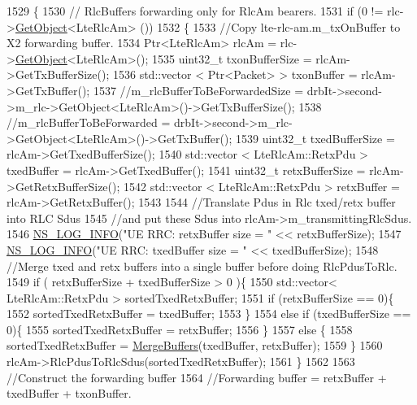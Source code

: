 \begin{DoxyCode}
1529 \{
1530   \textcolor{comment}{// RlcBuffers forwarding only for RlcAm bearers.}
1531   \textcolor{keywordflow}{if} (0 != rlc->\hyperlink{classns3_1_1Object_a13e18c00017096c8381eb651d5bd0783}{GetObject}<LteRlcAm> ())
1532   \{
1533     \textcolor{comment}{//Copy lte-rlc-am.m\_txOnBuffer to X2 forwarding buffer.}
1534     Ptr<LteRlcAm> rlcAm = rlc->\hyperlink{classns3_1_1Object_a13e18c00017096c8381eb651d5bd0783}{GetObject}<LteRlcAm>();
1535     uint32\_t txonBufferSize = rlcAm->GetTxBufferSize();
1536     std::vector < Ptr<Packet> > txonBuffer = rlcAm->GetTxBuffer();
1537     \textcolor{comment}{//m\_rlcBufferToBeForwardedSize =  drbIt->second->m\_rlc->GetObject<LteRlcAm>()->GetTxBufferSize();}
1538     \textcolor{comment}{//m\_rlcBufferToBeForwarded = drbIt->second->m\_rlc->GetObject<LteRlcAm>()->GetTxBuffer();}
1539     uint32\_t txedBufferSize = rlcAm->GetTxedBufferSize();
1540     std::vector < LteRlcAm::RetxPdu > txedBuffer = rlcAm->GetTxedBuffer();
1541     uint32\_t retxBufferSize = rlcAm->GetRetxBufferSize();
1542     std::vector < LteRlcAm::RetxPdu > retxBuffer = rlcAm->GetRetxBuffer();
1543     
1544     \textcolor{comment}{//Translate Pdus in Rlc txed/retx buffer into RLC Sdus}
1545     \textcolor{comment}{//and put these Sdus into rlcAm->m\_transmittingRlcSdus.}
1546     \hyperlink{group__logging_gafbd73ee2cf9f26b319f49086d8e860fb}{NS\_LOG\_INFO}(\textcolor{stringliteral}{"UE RRC: retxBuffer size = "} << retxBufferSize);
1547     \hyperlink{group__logging_gafbd73ee2cf9f26b319f49086d8e860fb}{NS\_LOG\_INFO}(\textcolor{stringliteral}{"UE RRC: txedBuffer size = "} << txedBufferSize);
1548     \textcolor{comment}{//Merge txed and retx buffers into a single buffer before doing RlcPdusToRlc.}
1549     \textcolor{keywordflow}{if} ( retxBufferSize + txedBufferSize > 0 )\{
1550       std::vector< LteRlcAm::RetxPdu > sortedTxedRetxBuffer;
1551       \textcolor{keywordflow}{if} (retxBufferSize == 0)\{
1552         sortedTxedRetxBuffer = txedBuffer;
1553       \}
1554       \textcolor{keywordflow}{else} \textcolor{keywordflow}{if} (txedBufferSize == 0)\{
1555         sortedTxedRetxBuffer = retxBuffer;
1556       \}
1557       \textcolor{keywordflow}{else} \{
1558         sortedTxedRetxBuffer = \hyperlink{classns3_1_1LteUeRrc_a512adbb14d23e5a412830174ef65bf00}{MergeBuffers}(txedBuffer, retxBuffer);
1559       \}
1560       rlcAm->RlcPdusToRlcSdus(sortedTxedRetxBuffer);  
1561     \}
1562 
1563     \textcolor{comment}{//Construct the forwarding buffer}
1564     \textcolor{comment}{//Forwarding buffer = retxBuffer + txedBuffer + txonBuffer.}

\end{DoxyCode}
